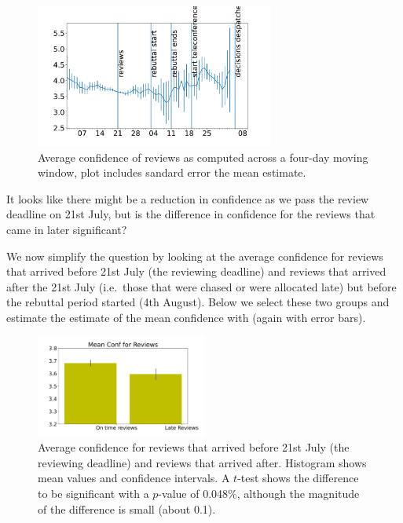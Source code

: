 \begin{figure}[htb]
\includegraphics[width=0.70\textwidth]{diagrams/neurips/review-confidence-time.pdf}


\caption{Average confidence of reviews as computed across a four-day moving window, plot includes sandard error the mean estimate.}
\label{review-confidence-time}
\end{figure}

It looks like there might be a reduction in confidence as we pass the
review deadline on 21st July, but is the difference in confidence for
the reviews that came in later significant?

We now simplify the question by looking at the average confidence for
reviews that arrived before 21st July (the reviewing deadline) and
reviews that arrived after the 21st July (i.e.~those that were chased or
were allocated late) but before the rebuttal period started (4th
August). Below we select these two groups and estimate the estimate of
the mean confidence with (again with error bars).

\begin{figure}[htb]
\includegraphics[width=0.50\textwidth]{diagrams/neurips/review-confidence-early-late.pdf}

\caption{Average confidence for reviews that arrived
before 21st July (the reviewing deadline) and reviews that arrived
after. Histogram shows mean values and confidence intervals. A
\(t\)-test shows the difference to be significant with a \(p\)-value of
0.048\%, although the magnitude of the difference is small (about
0.1).} \label{review-confidence-early-late}
\end{figure}

